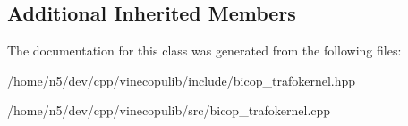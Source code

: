 \subsection*{Additional Inherited Members}


The documentation for this class was generated from the following files\+:\begin{DoxyCompactItemize}
\item 
/home/n5/dev/cpp/vinecopulib/include/bicop\+\_\+trafokernel.\+hpp\item 
/home/n5/dev/cpp/vinecopulib/src/bicop\+\_\+trafokernel.\+cpp\end{DoxyCompactItemize}
